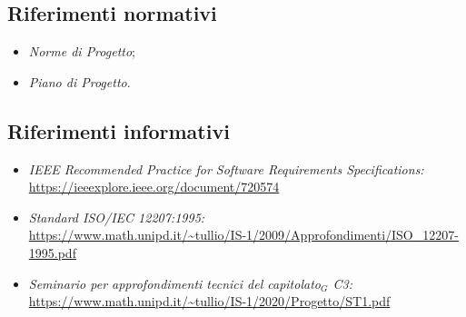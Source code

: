 \subsection{Riferimenti normativi}\label{IntroduzioneRiferimentiNormativi}
\begin{itemize}
	\item \textit{Norme di Progetto};
	\item \textit{Piano di Progetto}.
\end{itemize}
\subsection{Riferimenti informativi}\label{IntroduzioneRiferimentiInformativi}
\begin{itemize}
	\item \textit{IEEE Recommended Practice for Software Requirements Specifications:}\\
		\url{https://ieeexplore.ieee.org/document/720574}
	\item \textit{Standard ISO/IEC 12207:1995:}\\
		\url{https://www.math.unipd.it/~tullio/IS-1/2009/Approfondimenti/ISO_12207-1995.pdf}
	\item \textit{Seminario per approfondimenti tecnici del capitolato$_G$ C3:}\\
		\url{https://www.math.unipd.it/~tullio/IS-1/2020/Progetto/ST1.pdf}		
\end{itemize}